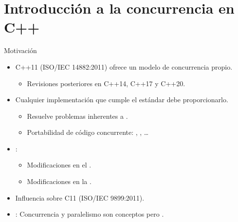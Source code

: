 \section{Introducción a la concurrencia en C++}

\begin{frame}{Motivación}
\begin{itemize}
  \item C++11 (ISO/IEC 14882:2011) ofrece un modelo de concurrencia propio.
    \begin{itemize}
      \item Revisiones posteriores en C++14, C++17 y C++20.
    \end{itemize}

  \item Cualquier implementación que cumple el estándar debe proporcionarlo.
    \begin{itemize}
      \item Resuelve problemas inherentes a .
      \item Portabilidad de código concurrente: , , \ldots
    \end{itemize}

  \item {}:
    \begin{itemize}
      \item Modificaciones en el .
      \item Modificaciones en la .
    \end{itemize}

  \item Influencia sobre C11 (ISO/IEC 9899:2011).

  \item {}: Concurrencia y paralelismo son conceptos 
         pero .
\end{itemize}
\end{frame}

